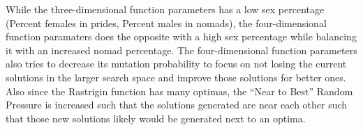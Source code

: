 \par While the three-dimensional function parameters has a low sex percentage (Percent females in prides, Percent males in nomads), the four-dimensional function paramaters does the opposite with a high sex percentage while balancing it with an increased nomad percentage. The four-dimensional function parameters also tries to decrease its mutation probability to focus on not losing the current solutions in the larger search space and improve those solutions for better ones. Also since the Rastrigin function has many optimas, the ``Near to Best'' Random Pressure is increased such that the solutions generated are near each other such that those new solutions likely would be generated next to an optima.

